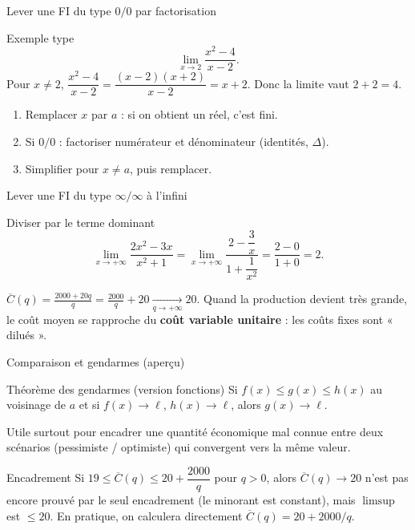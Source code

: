 \documentclass[10pt,aspectratio=169]{beamer}
\numberwithin{dummy}{section}
\begin{document}
\begin{frame}{Lever une FI du type $0/0$ par factorisation}
\begin{exampleblock}{Exemple type}
\[
\lim_{x\to 2}\frac{x^2-4}{x-2}.
\]
Pour $x\neq 2$, $\dfrac{x^2-4}{x-2}=\dfrac{(x-2)(x+2)}{x-2}=x+2$.
Donc la limite vaut $2+2=4$.
\end{exampleblock}

\vspace{0.3em}
\begin{boxmethode}[Recette]
\begin{enumerate}
    \item Remplacer $x$ par $a$ : si on obtient un réel, c'est fini.
    \item Si $0/0$ : factoriser numérateur et dénominateur (identités, $\Delta$).
    \item Simplifier pour $x\neq a$, puis remplacer.
\end{enumerate}
\end{boxmethode}
\end{frame}

\begin{frame}{Lever une FI du type $\infty/\infty$ à l'infini}
\begin{exampleblock}{Diviser par le terme dominant}
\[
\lim_{x\to+\infty}\frac{2x^2-3x}{x^2+1}
=\lim_{x\to+\infty}\frac{2-\dfrac{3}{x}}{1+\dfrac{1}{x^2}}
=\frac{2-0}{1+0}=2.
\]
\end{exampleblock}

\vspace{0.25em}
\begin{boxgestion}
$\displaystyle \overline{C}(q)=\frac{2000+20q}{q}=\frac{2000}{q}+20
\xrightarrow[q\to+\infty]{} 20$.
Quand la production devient très grande, le coût moyen se rapproche du
\textbf{coût variable unitaire} : les coûts fixes sont « dilués ».
\end{boxgestion}
\end{frame}

\begin{frame}{Comparaison et gendarmes (aperçu)}
\begin{block}{Théorème des gendarmes (version fonctions)}
Si $f(x)\leqslant g(x)\leqslant h(x)$ au voisinage de $a$ et si
$f(x)\to\ell$, $h(x)\to\ell$, alors $g(x)\to\ell$.
\end{block}

\vspace{0.3em}
Utile surtout pour encadrer une quantité économique mal connue
entre deux scénarios (pessimiste / optimiste) qui convergent vers la même valeur.

\vspace{0.5em}
\begin{exampleblock}{Encadrement}
Si $19\leqslant \overline{C}(q)\leqslant 20+\dfrac{2000}{q}$ pour $q>0$,
alors $\overline{C}(q)\to 20$ n'est pas encore prouvé par le seul encadrement
(le minorant est constant), mais $\limsup$ est $\leqslant 20$.
En pratique, on calculera directement $\overline{C}(q)=20+2000/q$.
\end{exampleblock}
\end{frame}
\end{document}
